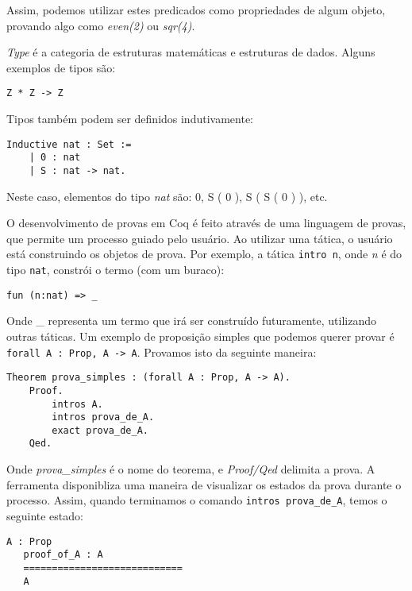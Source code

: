 Assim, podemos utilizar estes predicados como propriedades de algum objeto,
provando algo como \emph{even(2)} ou \emph{sqr(4)}.

\emph{Type} é a categoria de estruturas matemáticas e estruturas de dados.
Alguns exemplos de tipos são:

\begin{lstlisting}[basicstyle=\small]
    Z * Z -> Z
\end{lstlisting}

Tipos também podem ser definidos indutivamente:

\begin{lstlisting}[basicstyle=\small]
    Inductive nat : Set :=
    | 0 : nat
    | S : nat -> nat.
\end{lstlisting}

Neste caso, elementos do tipo \emph{nat} são: 0, S ( 0 ), S ( S ( 0 ) ), etc.

O desenvolvimento de provas em Coq é feito através de uma linguagem de provas,
que permite um processo guiado pelo usuário. Ao utilizar uma tática, o usuário
está construindo os objetos de prova. Por exemplo, a tática
\texttt{intro n}, onde \emph{n} é do tipo \texttt{nat}, constrói o termo (com um
buraco):

\begin{lstlisting}[basicstyle=\small]
    fun (n:nat) => _
\end{lstlisting}

Onde \_ representa um termo que irá ser construído futuramente, utilizando
outras táticas. Um exemplo de proposição simples que podemos querer provar é
\texttt{forall A : Prop, A -> A}. Provamos isto da seguinte maneira:

\begin{lstlisting}[basicstyle=\small]
    Theorem prova_simples : (forall A : Prop, A -> A).
    Proof.
        intros A.
        intros prova_de_A.
        exact prova_de_A.
    Qed.
\end{lstlisting}

Onde \emph{prova\_simples} é o nome do teorema, e \emph{Proof/Qed} delimita a
prova. A ferramenta disponibliza uma maneira de visualizar os estados da prova
durante o processo. Assim, quando terminamos o comando \texttt{intros
prova\_de\_A}, temos o seguinte estado:

\begin{lstlisting}[basicstyle=\small]
   A : Prop
   proof_of_A : A
   ============================
   A
\end{lstlisting}

